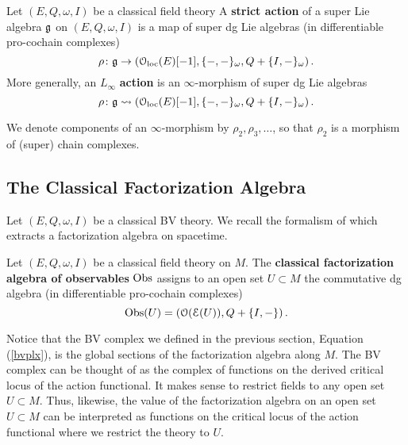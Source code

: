\documentclass[10pt, oneside]{article}
\begin{document}
\begin{dfn} \label{infinitesimal_action_def}
Let $(E, Q,\omega, I)$ be a classical field theory 
A {\bf strict action} of a super Lie algebra $\mathfrak g$ on $(E, Q,\omega, I)$ is a map of super dg Lie algebras (in differentiable pro-cochain complexes)
\[
\rho\colon \mathfrak g \to \left(\mathcal{O}_{\rm loc}(E)[-1] , \{-,-\}_\omega, Q + \{I,-\}_\omega\right) .
\]
More generally, an $L_\infty$ {\bf action} is an $\infty$-morphism of super dg Lie algebras
\[
\rho\colon \mathfrak g \rightsquigarrow \left(\mathcal{O}_{\rm loc}(E)[-1] , \{-,-\}_\omega, Q + \{I,-\}_\omega\right) .
\]
 
\end{dfn}

We denote components of an $\infty$-morphism by $\rho_2, \rho_3, \dots$, so that $\rho_2$ is a morphism of (super) chain complexes. 

\subsection{The Classical Factorization Algebra}


Let $(E, Q, \omega, I)$ be a classical BV theory. 
We recall the formalism of \cite{CG1,CG2} which extracts a factorization algebra on spacetime.

\begin{dfn}
Let $(E, Q, \omega, I)$ be a classical field theory on $M$.
The {\bf classical factorization algebra of observables} $\mathrm{Obs}$ assigns to an open set $U \subset M$ the commutative dg algebra (in differentiable pro-cochain complexes)
\[
\mathrm{Obs}(U) = \left(\mathcal O(\mathcal E(U)) , Q + \{I,-\}\right) .
\]
\end{dfn}

Notice that the BV complex we defined in the previous section, Equation (\ref{bvplx}), is the global sections of the factorization algebra along $M$.
The BV complex can be thought of as the complex of functions on the derived critical locus of the action functional.
It makes sense to restrict fields to any open set $U \subset M$. 
Thus, likewise, the value of the factorization algebra on an open set $U \subset M$ can be interpreted as functions on the critical locus of the action functional where we restrict the theory to $U$. 
\end{document}
